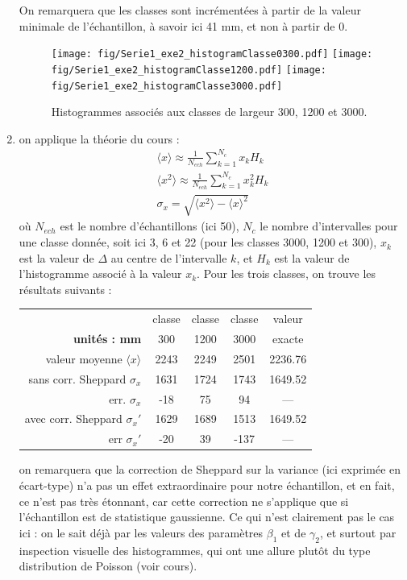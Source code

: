 \begin{enumerate}
\newpage
On remarquera que les classes sont incrémentées à partir de la valeur minimale de l'échantillon, à savoir ici 41 mm, et non à partir de 0.
\begin{figure}[ht] %
   \centering
   \texttt{[image: fig/Serie1\_exe2\_histogramClasse0300.pdf]}
   \texttt{[image: fig/Serie1\_exe2\_histogramClasse1200.pdf]}
   \texttt{[image: fig/Serie1\_exe2\_histogramClasse3000.pdf]}
   \caption{Histogrammes associés aux classes de largeur 300, 1200 et 3000.}
   \label{fig:02}
\end{figure}
\item on applique la théorie du cours :
\begin{gather}
\langle x \rangle \approx \frac{1}{N_{ech}}\sum\limits_{k=1}^{N_c} x_k H_k\\
\langle x^2 \rangle \approx \frac{1}{N_{ech}}\sum\limits_{k=1}^{N_c} x_k^2 H_k\\
\sigma_x=\sqrt{\langle x^2 \rangle-\langle x \rangle^2}
\end{gather}
où $N_{ech}$ est le nombre d'échantillons (ici 50), $N_c$ le nombre d'intervalles pour une classe donnée, soit ici 3, 6 et 22 (pour les classes 3000, 1200 et 300), $x_k$ est la valeur de $\Delta$ au centre de l'intervalle $k$, et $H_k$ est la valeur de l'histogramme associé à la valeur $x_k$. Pour les trois classes, on trouve les résultats suivants :
\begin{center}
\begin{tabular}{rcccc}
 & classe & classe & classe & valeur\\
\textbf{unités : mm} & 300 & 1200 & 3000 & exacte\\\hline
valeur moyenne $\langle x \rangle$ & 2243 & 2249 & 2501 & 2236.76 \\
sans corr. Sheppard $\sigma_x$ & 1631 & 1724 & 1743 & 1649.52\\
err. $\sigma_x$ & -18 & 75 & 94 & ---\\
avec corr. Sheppard $\sigma_x'$ & 1629 & 1689 & 1513 & 1649.52\\
err $\sigma_x'$ & -20 & 39 & -137 & ---\\
\hline
\end{tabular}
\end{center}
on remarquera que la correction de Sheppard sur la variance (ici exprimée en écart-type) n'a pas un effet extraordinaire pour notre échantillon, et en fait, ce n'est pas très étonnant, car cette correction ne s'applique que si l'échantillon est de statistique gaussienne. Ce qui n'est clairement pas le cas ici : on le sait déjà par les valeurs des paramètres $\beta_1$ et de $\gamma_2$, et surtout par inspection visuelle des histogrammes, qui ont une allure plutôt du type distribution de Poisson (voir cours).

\end{enumerate}

